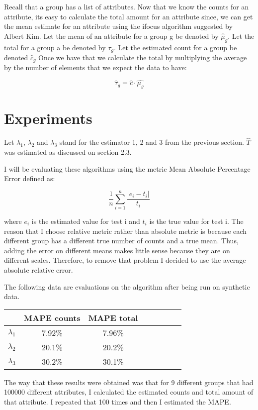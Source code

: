 \documentclass[a4paper]{article}
\begin{document}
Recall that a group has a list of attributes.
Now that we know the counts for an attribute, its easy to calculate the total amount for an attribute since, we can get the mean estimate for an attribute using the ifocus algorithm suggested by Albert Kim.
Let the mean of an attribute for a group g be denoted by $\hat{\mu}_g$. 
Let the total for a group a be denoted by $\tau_g$.
Let the estimated count for a group be denoted $\hat{c}_g$
Once we have that we calculate the total by multiplying the average by the number of elements that we expect the data to have:

$$\hat{ \tau}_g = \hat{c} \cdot \hat{\mu_g} $$


\section{Experiments}

Let $\lambda_1$, $\lambda_2$ and $\lambda_3$ stand for the estimator 1, 2 and 3 from the previous section.
$\hat{T}$ was estimated as discussed on section 2.3.

I will be evaluating these algorithms using the metric Mean Absolute Percentage Error defined as:

$$\frac{1}{n}\sum^{n}_{i=1}\frac{|e_i - t_i|}{t_i}$$

where $e_i$ is the estimated value for test i and $t_i$ is the true value for test i.
The reason that I choose relative metric rather than absolute metric is because each different group has a different true number of counts and a true mean.
Thus, adding the error on different means makes little sense because they are on different scales.
Therefore, to remove that problem I decided to use the average absolute relative error.

The following data are evaluations on the algorithm after being run on synthetic data.

\begin{tabular}{l*{6}{c}r}
  & MAPE counts & MAPE total  \\
\hline
$\lambda_1$ & 7.92\% &  7.96\% \\
$\lambda_2$  & 20.1\% & 20.2\%   \\
$\lambda_3$  & 30.2\% & 30.1\%    \\
\end{tabular}

The way that these results were obtained was that for 9 different groups that had 100000 different attributes, I calculated the estimated counts and total amount of that attribute.
I repeated that 100 times and then I estimated the MAPE.
\end{document}
